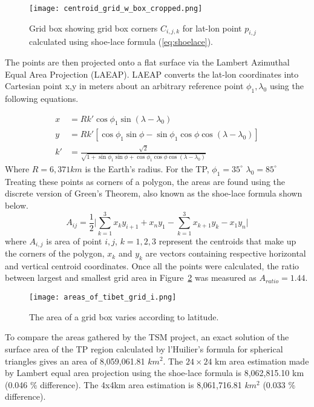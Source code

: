 \begin{figure}[ht]
\centering
\begin{minipage}{2.5in}
\texttt{[image: centroid\_grid\_w\_box\_cropped.png]}
\caption{Grid box showing grid box corners $C_{i,j,k}$ for lat-lon point $p_{i,j}$ calculated using shoe-lace formula (\ref{eq:shoelace}).}
\label{fig:centroid_grid}
\end{minipage}
\end{figure}

The points are then projected onto a flat surface via the Lambert Azimuthal Equal Area Projection (LAEAP)\cite{snyder1987map}. LAEAP converts the lat-lon coordinates into Cartesian point x,y in meters about an arbitrary reference point $\phi_{1},\lambda_{0}$ using the following equations.

\begin{align}
x &= R k' \cos\phi_{1}\sin(\lambda - \lambda_0) \\
y &= R k'[\cos\phi_{1}\sin\phi - \sin\phi_{1}\cos\phi \cos(\lambda - \lambda_{0})] \\
k' &= \frac{\sqrt{2}}{\sqrt{1+\sin\phi_{1}\sin\phi + \cos\phi_{1}\cos\phi \cos(\lambda - \lambda_{0})}}
\end{align}
Where $R=6,371 km$ is the Earth's radius. For the TP, $\phi_{1} = 35^{\circ}$ $\lambda_{0}=85^{\circ}$ Treating these points as corners of a polygon, the areas are found using the discrete version of Green's Theorem, also known as the shoe-lace \cite{braden1986surveyor} formula shown below.
\begin{equation} \label{eq:shoelace}
A_{ij} = \frac{1}{2} \vert \sum\limits_{k=1}^{3}x_{k}y_{i+1} + x_{n}y_{1} - \sum\limits_{k=1}^{3}x_{k+1}y_{k} - x_{1}y_{n} \vert 
\end{equation}
where $A_{i,j}$ is area of point $i,j$, $k = 1,2,3$ represent the centroids that make up the corners of the polygon, $x_k$ and $y_k$ are vectors containing respective horizontal and vertical centroid coordinates. Once all the points were calculated, the ratio between largest and smallest grid area in Figure~\ref{fig:areas_tibet} was measured as $A_{ratio} = 1.44$.
\begin{figure}[ht]
\centering
\begin{minipage}{6in}
\texttt{[image: areas\_of\_tibet\_grid\_i.png]}
\caption{The area of a grid box varies according to latitude.}
\label{fig:areas_tibet}
\end{minipage}
\end{figure}
To compare the areas gathered by the TSM project, an exact solution of the surface area of the TP region calculated by l'Huilier's formula for spherical triangles gives an area of 8,059,061.81 $km^2$. The $24 \times 24$ km area estimation made by Lambert equal area projection using the shoe-lace formula is 8,062,815.10 km (0.046 \% difference). The 4x4km area estimation is 8,061,716.81 $km^2$ (0.033 \% difference).

